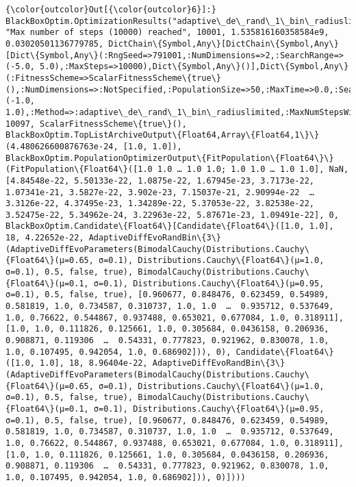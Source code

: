 \documentclass[11pt]{article}
\begin{document}
\begin{Verbatim}[commandchars=\\\{\}]
{\color{outcolor}Out[{\color{outcolor}6}]:} BlackBoxOptim.OptimizationResults("adaptive\_de\_rand\_1\_bin\_radiuslimited", "Max number of steps (10000) reached", 10001, 1.535816160358584e9, 0.03020501136779785, DictChain\{Symbol,Any\}[DictChain\{Symbol,Any\}[Dict\{Symbol,Any\}(:RngSeed=>791001,:NumDimensions=>2,:SearchRange=>(-5.0, 5.0),:MaxSteps=>10000),Dict\{Symbol,Any\}()],Dict\{Symbol,Any\}(:FitnessScheme=>ScalarFitnessScheme\{true\}(),:NumDimensions=>:NotSpecified,:PopulationSize=>50,:MaxTime=>0.0,:SearchRange=>(-1.0, 1.0),:Method=>:adaptive\_de\_rand\_1\_bin\_radiuslimited,:MaxNumStepsWithoutFuncEvals=>100,:RngSeed=>1234,:MaxFuncEvals=>0,:SaveTrace=>false…)], 10097, ScalarFitnessScheme\{true\}(), BlackBoxOptim.TopListArchiveOutput\{Float64,Array\{Float64,1\}\}(4.480626600876763e-24, [1.0, 1.0]), BlackBoxOptim.PopulationOptimizerOutput\{FitPopulation\{Float64\}\}(FitPopulation\{Float64\}([1.0 1.0 … 1.0 1.0; 1.0 1.0 … 1.0 1.0], NaN, [4.84548e-22, 5.50133e-22, 1.0875e-22, 1.67945e-23, 3.7173e-22, 1.07341e-21, 3.5827e-22, 3.902e-23, 7.15037e-21, 2.90994e-22  …  3.3126e-22, 4.37495e-23, 1.34289e-22, 5.37053e-22, 3.82538e-22, 3.52475e-22, 5.34962e-24, 3.22963e-22, 5.87671e-23, 1.09491e-22], 0, BlackBoxOptim.Candidate\{Float64\}[Candidate\{Float64\}([1.0, 1.0], 18, 4.22652e-22, AdaptiveDiffEvoRandBin\{3\}(AdaptiveDiffEvoParameters(BimodalCauchy(Distributions.Cauchy\{Float64\}(μ=0.65, σ=0.1), Distributions.Cauchy\{Float64\}(μ=1.0, σ=0.1), 0.5, false, true), BimodalCauchy(Distributions.Cauchy\{Float64\}(μ=0.1, σ=0.1), Distributions.Cauchy\{Float64\}(μ=0.95, σ=0.1), 0.5, false, true), [0.960677, 0.848476, 0.623459, 0.54989, 0.581819, 1.0, 0.734587, 0.310737, 1.0, 1.0  …  0.935712, 0.537649, 1.0, 0.76622, 0.544867, 0.937488, 0.653021, 0.677084, 1.0, 0.318911], [1.0, 1.0, 0.111826, 0.125661, 1.0, 0.305684, 0.0436158, 0.206936, 0.908871, 0.119306  …  0.54331, 0.777823, 0.921962, 0.830078, 1.0, 1.0, 0.107495, 0.942054, 1.0, 0.686902])), 0), Candidate\{Float64\}([1.0, 1.0], 18, 8.96404e-22, AdaptiveDiffEvoRandBin\{3\}(AdaptiveDiffEvoParameters(BimodalCauchy(Distributions.Cauchy\{Float64\}(μ=0.65, σ=0.1), Distributions.Cauchy\{Float64\}(μ=1.0, σ=0.1), 0.5, false, true), BimodalCauchy(Distributions.Cauchy\{Float64\}(μ=0.1, σ=0.1), Distributions.Cauchy\{Float64\}(μ=0.95, σ=0.1), 0.5, false, true), [0.960677, 0.848476, 0.623459, 0.54989, 0.581819, 1.0, 0.734587, 0.310737, 1.0, 1.0  …  0.935712, 0.537649, 1.0, 0.76622, 0.544867, 0.937488, 0.653021, 0.677084, 1.0, 0.318911], [1.0, 1.0, 0.111826, 0.125661, 1.0, 0.305684, 0.0436158, 0.206936, 0.908871, 0.119306  …  0.54331, 0.777823, 0.921962, 0.830078, 1.0, 1.0, 0.107495, 0.942054, 1.0, 0.686902])), 0)])))
\end{Verbatim}
            
\end{document}
